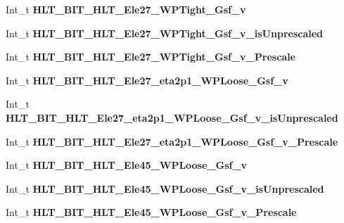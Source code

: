 \begin{DoxyCompactItemize}
Int\+\_\+t {\bfseries H\+L\+T\+\_\+\+B\+I\+T\+\_\+\+H\+L\+T\+\_\+\+Ele27\+\_\+\+W\+P\+Tight\+\_\+\+Gsf\+\_\+v}
\item 
\hypertarget{classMiniTree_a624474f49b487fef84e06f9be8688aa8}{}\label{classMiniTree_a624474f49b487fef84e06f9be8688aa8} 
Int\+\_\+t {\bfseries H\+L\+T\+\_\+\+B\+I\+T\+\_\+\+H\+L\+T\+\_\+\+Ele27\+\_\+\+W\+P\+Tight\+\_\+\+Gsf\+\_\+v\+\_\+is\+Unprescaled}
\item 
\hypertarget{classMiniTree_ac4a3a210e5ca912462f53d7309225d16}{}\label{classMiniTree_ac4a3a210e5ca912462f53d7309225d16} 
Int\+\_\+t {\bfseries H\+L\+T\+\_\+\+B\+I\+T\+\_\+\+H\+L\+T\+\_\+\+Ele27\+\_\+\+W\+P\+Tight\+\_\+\+Gsf\+\_\+v\+\_\+\+Prescale}
\item 
\hypertarget{classMiniTree_adf565965d9b0e18c8bcbc2e66b1f3456}{}\label{classMiniTree_adf565965d9b0e18c8bcbc2e66b1f3456} 
Int\+\_\+t {\bfseries H\+L\+T\+\_\+\+B\+I\+T\+\_\+\+H\+L\+T\+\_\+\+Ele27\+\_\+eta2p1\+\_\+\+W\+P\+Loose\+\_\+\+Gsf\+\_\+v}
\item 
\hypertarget{classMiniTree_a31dd2e0a556205ab72b564b8ff335c3a}{}\label{classMiniTree_a31dd2e0a556205ab72b564b8ff335c3a} 
Int\+\_\+t {\bfseries H\+L\+T\+\_\+\+B\+I\+T\+\_\+\+H\+L\+T\+\_\+\+Ele27\+\_\+eta2p1\+\_\+\+W\+P\+Loose\+\_\+\+Gsf\+\_\+v\+\_\+is\+Unprescaled}
\item 
\hypertarget{classMiniTree_a5569b57c4247a2ff790924fe3ef38b8f}{}\label{classMiniTree_a5569b57c4247a2ff790924fe3ef38b8f} 
Int\+\_\+t {\bfseries H\+L\+T\+\_\+\+B\+I\+T\+\_\+\+H\+L\+T\+\_\+\+Ele27\+\_\+eta2p1\+\_\+\+W\+P\+Loose\+\_\+\+Gsf\+\_\+v\+\_\+\+Prescale}
\item 
\hypertarget{classMiniTree_a03d7cca4f6e92b9599bedc6a5e6729b9}{}\label{classMiniTree_a03d7cca4f6e92b9599bedc6a5e6729b9} 
Int\+\_\+t {\bfseries H\+L\+T\+\_\+\+B\+I\+T\+\_\+\+H\+L\+T\+\_\+\+Ele45\+\_\+\+W\+P\+Loose\+\_\+\+Gsf\+\_\+v}
\item 
\hypertarget{classMiniTree_aac1c68227f7e09a212ce2b4685e34428}{}\label{classMiniTree_aac1c68227f7e09a212ce2b4685e34428} 
Int\+\_\+t {\bfseries H\+L\+T\+\_\+\+B\+I\+T\+\_\+\+H\+L\+T\+\_\+\+Ele45\+\_\+\+W\+P\+Loose\+\_\+\+Gsf\+\_\+v\+\_\+is\+Unprescaled}
\item 
\hypertarget{classMiniTree_a41f936d3a67b1e4c012bb1a3e984baed}{}\label{classMiniTree_a41f936d3a67b1e4c012bb1a3e984baed} 
Int\+\_\+t {\bfseries H\+L\+T\+\_\+\+B\+I\+T\+\_\+\+H\+L\+T\+\_\+\+Ele45\+\_\+\+W\+P\+Loose\+\_\+\+Gsf\+\_\+v\+\_\+\+Prescale}
\item 
\hypertarget{classMiniTree_aa8a748b6c1f553a0b528a8d081ec4e47}{}\label{classMiniTree_aa8a748b6c1f553a0b528a8d081ec4e47} 

\end{DoxyCompactItemize}
